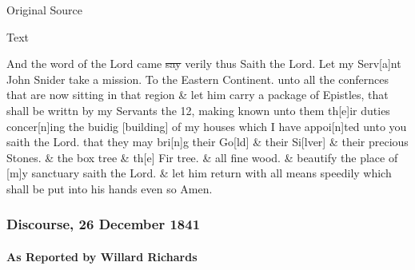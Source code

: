 			
			\begin{description}
				\item[Original Source]
			\end{description}
			
			
			\begin{description}
				\item[Text]
			\end{description}
			
				And the word of the Lord came \sout{say} verily thus Saith the Lord. Let my Serv[a]nt John Snider take a mission. To the Eastern Continent. unto all the confernces that are now sitting in that region \& let him carry a package of Epistles, that shall be writtn by my Servants the 12, making known unto them th[e]ir duties concer[n]ing the buidig [building] of my houses which I have appoi[n]ted unto you saith the Lord. that they may bri[n]g their Go[ld] \& their Si[lver] \& their precious Stones. \& the box tree \& th[e] Fir tree. \& all fine wood. \& beautify the place of [m]y sanctuary saith the Lord. \& let him return with all means speedily which shall be put into his hands even so Amen.
				
		\subsubsection{Discourse, 26 December 1841}
			\label{EMS-1841-JS-26-DEC-1841}
			
			\paragraph{As Reported by Willard Richards}
				\label{EMS-1841-JS-26-DEC-1841-WR}
				

